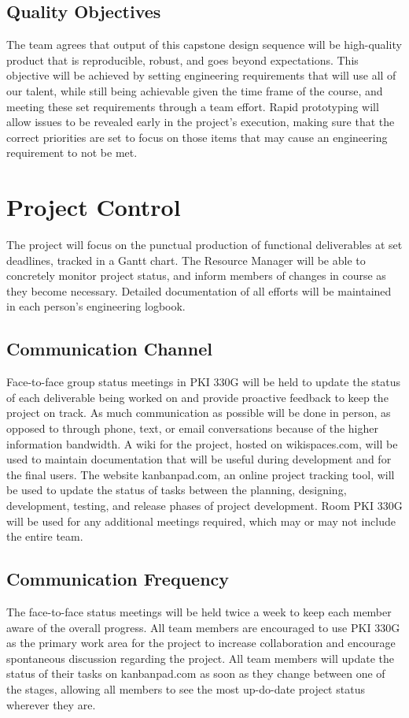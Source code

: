 \subsection{Quality Objectives}
The team agrees that output of this capstone design sequence will be high-quality product that is reproducible, robust, and goes beyond expectations.
This objective will be achieved by setting engineering requirements that will use all of our talent, while still being achievable given the time frame of the course, and meeting these set requirements through a team effort.
Rapid prototyping will allow issues to be revealed early in the project's execution, making sure that the correct priorities are set to focus on those items that may cause an engineering requirement to not be met.

\section{Project Control}
The project will focus on the punctual production of functional deliverables at set deadlines, tracked in a Gantt chart.
The Resource Manager will be able to concretely monitor project status, and inform members of changes in course as they become necessary.
Detailed documentation of all efforts will be maintained in each person's engineering logbook.

\subsection{Communication Channel}
Face-to-face group status meetings in PKI 330G will be held to update the status of each deliverable being worked on and provide proactive feedback to keep the project on track.
As much communication as possible will be done in person, as opposed to through phone, text, or email conversations because of the higher information bandwidth.
A wiki for the project, hosted on wikispaces.com, will be used to maintain documentation that will be useful during development and for the final users. 
The website kanbanpad.com, an online project tracking tool, will be used to update the status of tasks between the planning, designing, development, testing, and release phases of project development.
Room PKI 330G will be used for any additional meetings required, which may or may not include the entire team.

\subsection{Communication Frequency}
The face-to-face status meetings will be held twice a week to keep each member aware of the overall progress.
All team members are encouraged to use PKI 330G as the primary work area for the project to increase collaboration and encourage spontaneous discussion regarding the project.
All team members will update the status of their tasks on kanbanpad.com as soon as they change between one of the stages, allowing all members to see the most up-do-date project status wherever they are.

